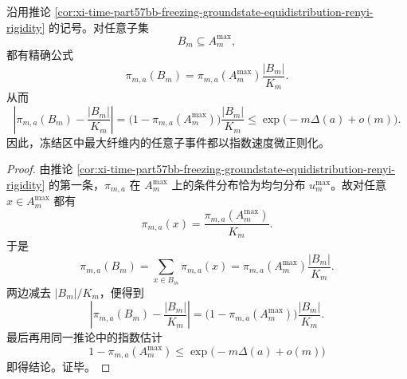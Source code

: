 \begin{corollary}\label{cor:xi-time-part57bb-freezing-groundstate-subset-equidistribution}
沿用推论 \ref{cor:xi-time-part57bb-freezing-groundstate-equidistribution-renyi-rigidity} 的记号。对任意子集
\[
B_m\subseteq A_m^{\max},
\]
都有精确公式
\[
\pi_{m,a}(B_m)
=
\pi_{m,a}(A_m^{\max})\frac{|B_m|}{K_m}.
\]
从而
\[
\left|
\pi_{m,a}(B_m)-\frac{|B_m|}{K_m}
\right|
=
\bigl(1-\pi_{m,a}(A_m^{\max})\bigr)\frac{|B_m|}{K_m}
\le
\exp\!\bigl(-m\Delta(a)+o(m)\bigr).
\]
因此，冻结区中最大纤维内的任意子事件都以指数速度微正则化。
\end{corollary}
\begin{proof}
由推论 \ref{cor:xi-time-part57bb-freezing-groundstate-equidistribution-renyi-rigidity} 的第一条，\(\pi_{m,a}\) 在 \(A_m^{\max}\) 上的条件分布恰为均匀分布 \(u_m^{\max}\)。故对任意 \(x\in A_m^{\max}\) 都有
\[
\pi_{m,a}(x)=\frac{\pi_{m,a}(A_m^{\max})}{K_m}.
\]
于是
\[
\pi_{m,a}(B_m)
=
\sum_{x\in B_m}\pi_{m,a}(x)
=
\pi_{m,a}(A_m^{\max})\frac{|B_m|}{K_m}.
\]
两边减去 \(|B_m|/K_m\)，便得到
\[
\left|
\pi_{m,a}(B_m)-\frac{|B_m|}{K_m}
\right|
=
\bigl(1-\pi_{m,a}(A_m^{\max})\bigr)\frac{|B_m|}{K_m}.
\]
最后再用同一推论中的指数估计
\[
1-\pi_{m,a}(A_m^{\max})\le \exp\!\bigl(-m\Delta(a)+o(m)\bigr)
\]
即得结论。证毕。
\end{proof}

\endinput
